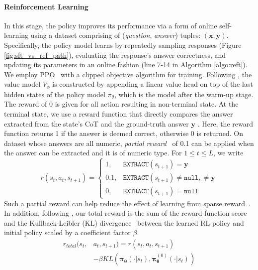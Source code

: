 \paragraph{Reinforcement Learning}
In this stage, the policy improves its performance via a form of online self-learning using a dataset comprising of (\textit{question}, \textit{answer}) tuples: $(\boldsymbol{x}, \boldsymbol{y})$. 
Specifically, the policy model learns by repeatedly sampling responses (Figure \ref{fig:sft_vs_ref_path}), evaluating the response's answer correctness, and updating its parameters in an online fashion (line 7-14 in Algorithm \ref{algo:reft}).
We employ PPO~\cite{schulman2017proximal} with a clipped objective algorithm for training. 
Following \citet{ziegler2019fine}, the value model $V_{\phi}$ is constructed by appending a linear value head on top of the last hidden states of the policy model $\pi_{\theta}$, which is the model after the warm-up stage.
The reward of 0 is given for all action resulting in non-terminal state. 
At the terminal state, we use a reward function that directly compares the answer extracted from the state's CoT and the ground-truth answer $\boldsymbol{y}$ . 
Here, the reward function returns 1 if the answer is deemed correct, otherwise 0 is returned. 
On dataset whose answers are all numeric, \textit{partial reward}~\cite{zhong2017seq2sql,le2022coderl} of 0.1 can be applied when the answer can be extracted and it is of numeric type. 
For $1 \leq t \leq L$, we write
\begin{equation}
    r(s_t, a_t, s_{t+1})\! =\! 
        \begin{cases} 
            1, &  \!\!\!\!\! \texttt{EXTRACT}(s_{t+1}) = \boldsymbol{y} \\
            0.1, &\!\!\!\!\! \texttt{EXTRACT}(s_{t+1}) \neq \texttt{null}, \neq \boldsymbol{y} \\
            0, & \!\!\!\!\! \texttt{EXTRACT}(s_{t+1}) = \texttt{null}
    \end{cases}
    \nonumber
    \label{equ:reward_function}
\end{equation}
Such a partial reward can help reduce the effect of learning from sparse reward~\cite{riedmiller2018learning,trott2019keeping}.
In addition, following \citet{zheng2023secrets}, our total reward is the sum of the reward function score and the Kullback-Leibler (KL) divergence~\cite{kullback1951information} between the learned RL policy and initial policy scaled by a coefficient factor $\beta$. 
\begin{equation*}
    \begin{split}
        r_{total}(s_{t}, & a_{t},s_{t+1})=r(s_{t},a_{t},s_{t+1}) \\ & - \beta \textit{KL}\left(\boldsymbol{\pi}_{\boldsymbol{\theta}}(\cdot|s_t), \boldsymbol{\pi}_{\boldsymbol{\theta}}^{(0)}(\cdot|s_t)\right)
    \end{split}
\end{equation*}
